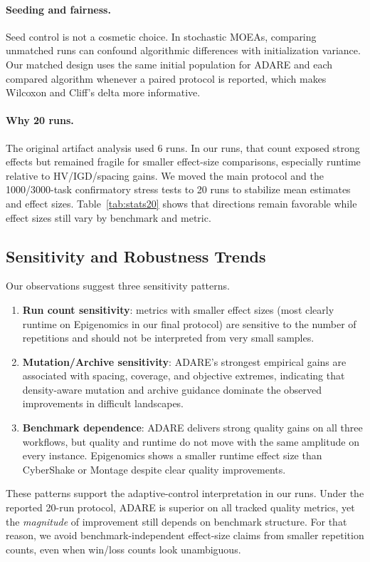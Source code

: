 \documentclass[runningheads]{llncs}
\begin{document}
\paragraph{Seeding and fairness.}
Seed control is not a cosmetic choice. In stochastic MOEAs, comparing unmatched runs can confound algorithmic differences with initialization variance. Our matched design uses the same initial population for ADARE and each compared algorithm whenever a paired protocol is reported, which makes Wilcoxon and Cliff's delta more informative.

\paragraph{Why 20 runs.}
The original artifact analysis used 6 runs. In our runs, that count exposed strong effects but remained fragile for smaller effect-size comparisons, especially runtime relative to HV/IGD/spacing gains. We moved the main protocol and the 1000/3000-task confirmatory stress tests to 20 runs to stabilize mean estimates and effect sizes. Table~\ref{tab:stats20} shows that directions remain favorable while effect sizes still vary by benchmark and metric.

\subsection{Sensitivity and Robustness Trends}
Our observations suggest three sensitivity patterns.
\begin{enumerate}
    \item \textbf{Run count sensitivity}: metrics with smaller effect sizes (most clearly runtime on Epigenomics in our final protocol) are sensitive to the number of repetitions and should not be interpreted from very small samples.
    \item \textbf{Mutation/Archive sensitivity}: ADARE's strongest empirical gains are associated with spacing, coverage, and objective extremes, indicating that density-aware mutation and archive guidance dominate the observed improvements in difficult landscapes.
    \item \textbf{Benchmark dependence}: ADARE delivers strong quality gains on all three workflows, but quality and runtime do not move with the same amplitude on every instance. Epigenomics shows a smaller runtime effect size than CyberShake or Montage despite clear quality improvements.
\end{enumerate}

These patterns support the adaptive-control interpretation in our runs. Under the reported 20-run protocol, ADARE is superior on all tracked quality metrics, yet the \emph{magnitude} of improvement still depends on benchmark structure. For that reason, we avoid benchmark-independent effect-size claims from smaller repetition counts, even when win/loss counts look unambiguous.
\end{document}

